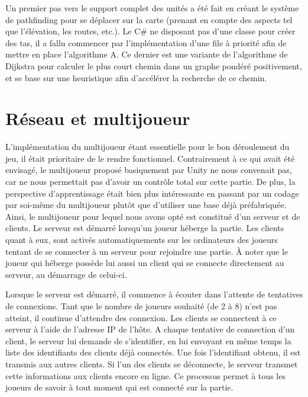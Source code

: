 \documentclass[12pt]{report}
\begin{document}
\begin{figure}[H]
    \centering
\end{figure}

Un premier pas vers le support complet des unités a été fait en créant le système de pathfinding pour se déplacer sur la carte (prenant en compte des aspects tel que l’élévation, les routes, etc.). Le C\# ne disposant pas d’une classe pour créer des tas, il a fallu commencer par l’implémentation d’une file à priorité afin de mettre en place l’algorithme A\*. Ce dernier est une variante de l’algorithme de Dijkstra pour calculer le plus court chemin dans un graphe pondéré positivement, et se base sur une heuristique afin d’accélérer la recherche de ce chemin.

\begin{figure}[H]
    \centering
\end{figure}

\section{Réseau et multijoueur}

L’implémentation du multijoueur étant essentielle pour le bon déroulement du jeu, il était prioritaire de le rendre fonctionnel. Contrairement à ce qui avait été envisagé, le multijoueur proposé basiquement par Unity ne nous convenait pas, car ne nous permettait pas d’avoir un contrôle total sur cette partie. De plus, la perspective d’apprentissage était bien plus intéressante en passant par un codage par soi-même du multijoueur plutôt que d’utiliser une base déjà préfabriquée. 
Ainsi, le multijoueur pour lequel nous avons opté est constitué d’un serveur et de clients. Le serveur est démarré lorsqu’un joueur héberge la partie. Les clients quant à eux, sont activés automatiquements sur les ordinateurs des joueurs tentant de se connecter à un serveur pour rejoindre une partie. À noter que le joueur qui héberge possède lui aussi un client qui se connecte directement au serveur, au démarrage de celui-ci.

Lorsque le serveur est démarré, il commence à écouter dans l’attente de tentatives de connexions. Tant que le nombre de joueurs souhaité (de 2 à 8) n’est pas atteint, il continue d’attendre des connexion. Les clients se connectent à ce serveur à l’aide de l’adresse IP de l’hôte. A chaque tentative de connection d’un client, le serveur lui demande de s’identifier, en lui envoyant en même temps la liste des identifiants des clients déjà connectés. Une fois l’identifiant obtenu, il est transmis aux autres clients. Si l’un des clients se déconnecte, le serveur transmet cette informations aux clients encore en ligne. Ce processus permet à tous les joueurs de savoir à tout moment qui est connecté sur la partie.
\end{document}
